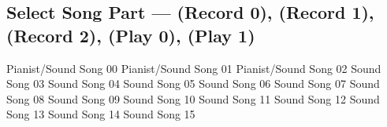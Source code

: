 \subsection[Select Song Part]{Select Song Part --- \UiKey{\I}\UiKey{\REC} (Record 0), \UiKey{\II}\UiKey{\REC} (Record 1), \UiKey{\I}\UiKey{\II}\UiKey{\REC} (Record 2), \UiKey{\I}\UiKey{\PL} (Play 0), \UiKey{\II}\UiKey{\PL} (Play 1)}
Pianist/Sound Song 00
Pianist/Sound Song 01
Pianist/Sound Song 02
Sound Song 03
Sound Song 04
Sound Song 05
Sound Song 06
Sound Song 07
Sound Song 08
Sound Song 09
Sound Song 10
Sound Song 11
Sound Song 12
Sound Song 13
Sound Song 14
Sound Song 15
